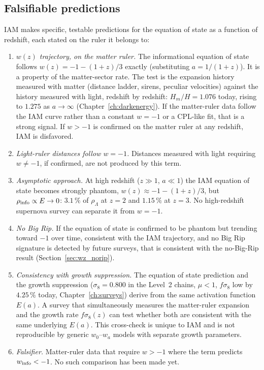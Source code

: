 \subsection{Falsifiable predictions}\label{sec:wz_tests}
IAM makes specific, testable predictions for the equation of state as a function of redshift, each stated on the ruler it belongs to:
\begin{enumerate}
\item \emph{$w(z)$ trajectory, on the matter ruler.} The informational equation of state follows $w(z)=-1-(1+z)/3$ exactly (substituting
$a=1/(1+z)$). It is a property of the matter-sector rate. The test is the expansion history measured with matter (distance ladder, sirens, peculiar
velocities) against the history measured with light, redshift by redshift: $H_m/H=1.076$ today, rising to $1.275$ as $a\to\infty$
(Chapter~\ref{ch:darkenergy}). If the matter-ruler data follow the IAM curve rather than a constant $w=-1$ or a CPL-like fit, that is a strong signal.
If $w>-1$ is confirmed on the matter ruler at any redshift, IAM is disfavored. \prediction
\item \emph{Light-ruler distances follow $w=-1$.} Distances measured with light requiring $w\neq-1$, if confirmed, are not produced by this term.
\prediction
\item \emph{Asymptotic approach.} At high redshift ($z\gg1$, $a\ll1$) the IAM equation of state becomes strongly phantom,
$w(z)\approx-1-(1+z)/3$, but $\rho_{\rm info}\propto E\to0$: $3.1\,\%$ of $\rho_\Lambda$ at $z=2$ and $1.15\,\%$ at $z=3$. No high-redshift
supernova survey can separate it from $w=-1$. \calc
\item \emph{No Big Rip.} If the equation of state is confirmed to be phantom but trending toward $-1$ over time, consistent with the IAM trajectory,
and no Big Rip signature is detected by future surveys, that is consistent with the no-Big-Rip result (Section~\ref{sec:wz_norip}). \prediction
\item \emph{Consistency with growth suppression.} The equation of state prediction and the growth suppression ($\sigma_8=0.800$ in the Level~2
chains, $\mu<1$, $f\sigma_8$ low by $4.25\,\%$ today, Chapter~\ref{ch:surveys}) derive from the same activation function $E(a)$. A survey that
simultaneously measures the matter-ruler expansion and the growth rate $f\sigma_8(z)$ can test whether both are consistent with the same underlying
$E(a)$. This cross-check is unique to IAM and is not reproducible by generic $w_0$--$w_a$ models with separate growth parameters. \prediction
\item \emph{Falsifier.} Matter-ruler data that require $w>-1$ where the term predicts $w_{\rm info}<-1$. No such comparison has been made yet.
\openprob
\end{enumerate}


